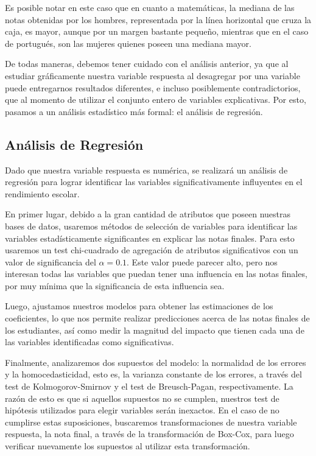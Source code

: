 \documentclass[
]{article}
\begin{document}
Es posible notar en este caso que en cuanto a matemáticas, la mediana de
las notas obtenidas por los hombres, representada por la línea
horizontal que cruza la caja, es mayor, aunque por un margen bastante
pequeño, mientras que en el caso de portugués, son las mujeres quienes
poseen una mediana mayor.

De todas maneras, debemos tener cuidado con el análisis anterior, ya que
al estudiar gráficamente nuestra variable respuesta al desagregar por
una variable puede entregarnos resultados diferentes, e incluso
posiblemente contradictorios, que al momento de utilizar el conjunto
entero de variables explicativas. Por esto, pasamos a un análisis
estadístico más formal: el análisis de regresión.

\hypertarget{anuxe1lisis-de-regresiuxf3n}{%
\subsection{Análisis de Regresión}\label{anuxe1lisis-de-regresiuxf3n}}

Dado que nuestra variable respuesta es numérica, se realizará un
análisis de regresión para lograr identificar las variables
significativamente influyentes en el rendimiento escolar.

En primer lugar, debido a la gran cantidad de atributos que poseen
nuestras bases de datos, usaremos métodos de selección de variables para
identificar las variables estadísticamente significantes en explicar las
notas finales. Para esto usaremos un test chi-cuadrado de agregación de
atributos significativos con un valor de significancia del
\(\alpha = 0.1\). Este valor puede parecer alto, pero nos interesan
todas las variables que puedan tener una influencia en las notas
finales, por muy mínima que la significancia de esta influencia sea.

Luego, ajustamos nuestros modelos para obtener las estimaciones de los
coeficientes, lo que nos permite realizar predicciones acerca de las
notas finales de los estudiantes, así como medir la magnitud del impacto
que tienen cada una de las variables identificadas como significativas.

Finalmente, analizaremos dos supuestos del modelo: la normalidad de los
errores y la homocedasticidad, esto es, la varianza constante de los
errores, a través del test de Kolmogorov-Smirnov y el test de
Breusch-Pagan, respectivamente. La razón de esto es que si aquellos
supuestos no se cumplen, nuestros test de hipótesis utilizados para
elegir variables serán inexactos. En el caso de no cumplirse estas
suposiciones, buscaremos transformaciones de nuestra variable respuesta,
la nota final, a través de la transformación de Box-Cox, para luego
verificar nuevamente los supuestos al utilizar esta transformación.
\end{document}
